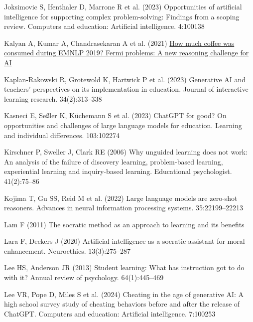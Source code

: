 \documentclass[
  11pt,
]{article}
\newlength{\cslhangindent}
\newenvironment{CSLReferences}[2] %
 {\begin{list}{}{%
  \setlength{\itemindent}{0pt}
  \setlength{\leftmargin}{0pt}
  \setlength{\parsep}{0pt}
  \ifodd #1
   \setlength{\leftmargin}{\cslhangindent}
   \setlength{\itemindent}{-1\cslhangindent}
  \fi
  \setlength{\itemsep}{#2\baselineskip}}}
 {\end{list}}
\begin{document}
\begin{CSLReferences}{1}{0}
Joksimovic S, Ifenthaler D, Marrone R et al. (2023) Opportunities of artificial intelligence for supporting complex problem-solving: Findings from a scoping review. Computers and education: Artificial intelligence. 4:100138

Kalyan A, Kumar A, Chandrasekaran A et al. (2021) \href{https://arxiv.org/pdf/2110.14207.pdf}{How much coffee was consumed during EMNLP 2019? Fermi problems: A new reasoning challenge for AI}

Kaplan-Rakowski R, Grotewold K, Hartwick P et al. (2023) Generative AI and teachers' perspectives on its implementation in education. Journal of interactive learning research. 34(2):313--338

Kasneci E, Seßler K, Küchemann S et al. (2023) ChatGPT for good? On opportunities and challenges of large language models for education. Learning and individual differences. 103:102274

Kirschner P, Sweller J, Clark RE (2006) Why unguided learning does not work: An analysis of the failure of discovery learning, problem-based learning, experiential learning and inquiry-based learning. Educational psychologist. 41(2):75--86

Kojima T, Gu SS, Reid M et al. (2022) Large language models are zero-shot reasoners. Advances in neural information processing systems. 35:22199--22213

Lam F (2011) The socratic method as an approach to learning and its benefits

Lara F, Deckers J (2020) Artificial intelligence as a socratic assistant for moral enhancement. Neuroethics. 13(3):275--287

Lee HS, Anderson JR (2013) Student learning: What has instruction got to do with it? Annual review of psychology. 64(1):445--469

Lee VR, Pope D, Miles S et al. (2024) Cheating in the age of generative AI: A high school survey study of cheating behaviors before and after the release of ChatGPT. Computers and education: Artificial intelligence. 7:100253


\end{CSLReferences}
\end{document}
